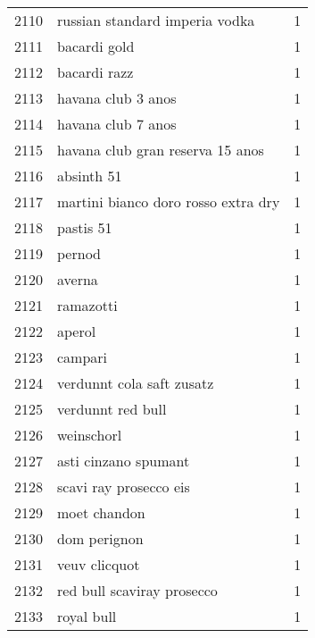 \begin{tabular}{llr}
2110 &                     russian standard imperia vodka &      1 \\
2111 &                                       bacardi gold &      1 \\
2112 &                                       bacardi razz &      1 \\
2113 &                                 havana club 3 anos &      1 \\
2114 &                                 havana club 7 anos &      1 \\
2115 &                   havana club gran reserva 15 anos &      1 \\
2116 &                                         absinth 51 &      1 \\
2117 &                martini bianco doro rosso extra dry &      1 \\
2118 &                                          pastis 51 &      1 \\
2119 &                                             pernod &      1 \\
2120 &                                             averna &      1 \\
2121 &                                          ramazotti &      1 \\
2122 &                                             aperol &      1 \\
2123 &                                            campari &      1 \\
2124 &                          verdunnt cola saft zusatz &      1 \\
2125 &                                  verdunnt red bull &      1 \\
2126 &                                         weinschorl &      1 \\
2127 &                               asti cinzano spumant &      1 \\
2128 &                             scavi ray prosecco eis &      1 \\
2129 &                                       moet chandon &      1 \\
2130 &                                       dom perignon &      1 \\
2131 &                                      veuv clicquot &      1 \\
2132 &                         red bull scaviray prosecco &      1 \\
2133 &                                         royal bull &      1 \\

\end{tabular}
